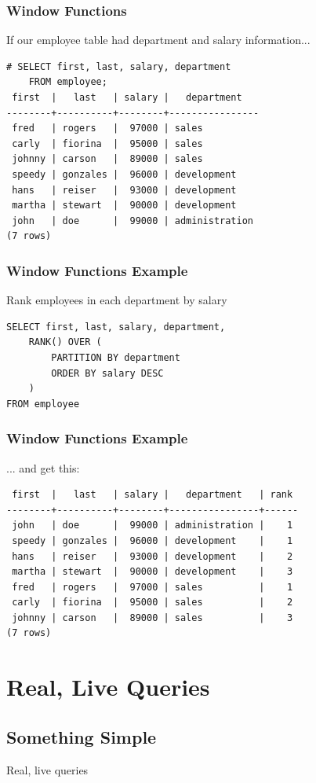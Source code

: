\documentclass{beamer}
\begin{document}
\begin{frame}[fragile]
    \frametitle{Window Functions}
    If our employee table had department and salary information...
    \begin{verbatim}
# SELECT first, last, salary, department
    FROM employee;
 first  |   last   | salary |   department
--------+----------+--------+----------------
 fred   | rogers   |  97000 | sales
 carly  | fiorina  |  95000 | sales
 johnny | carson   |  89000 | sales
 speedy | gonzales |  96000 | development
 hans   | reiser   |  93000 | development
 martha | stewart  |  90000 | development
 john   | doe      |  99000 | administration
(7 rows)
    \end{verbatim}
\end{frame}

\begin{frame}[fragile]
    \frametitle{Window Functions Example}
    Rank employees in each department by salary
    \begin{verbatim}
SELECT first, last, salary, department,
    RANK() OVER (
        PARTITION BY department
        ORDER BY salary DESC
    )
FROM employee
    \end{verbatim}
\end{frame}

\begin{frame}[fragile]
    \frametitle{Window Functions Example}
    ... and get this:
    \footnotesize
    \begin{verbatim}
 first  |   last   | salary |   department   | rank
--------+----------+--------+----------------+------
 john   | doe      |  99000 | administration |    1
 speedy | gonzales |  96000 | development    |    1
 hans   | reiser   |  93000 | development    |    2
 martha | stewart  |  90000 | development    |    3
 fred   | rogers   |  97000 | sales          |    1
 carly  | fiorina  |  95000 | sales          |    2
 johnny | carson   |  89000 | sales          |    3
(7 rows)
    \end{verbatim}
    \normalsize
\end{frame}

\section{Real, Live Queries}
\subsection{Something Simple}
\begin{frame}
    \begin{center}
       Real, live queries
    \end{center}
\end{frame}
\end{document}
